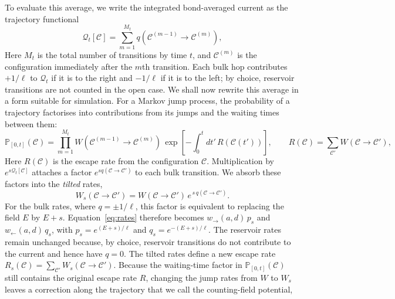 \documentclass[11pt]{article}
\begin{document}
To evaluate this average, we write the integrated bond-averaged current as the trajectory functional
\begin{equation}
    \mathcal{Q}_t[\mathcal{C}] = \sum_{m=1}^{M_t}
        q\!\left(\mathcal{C}^{(m-1)} \to \mathcal{C}^{(m)}\right),
    \label{eq:counting}
\end{equation}
Here $M_t$ is the total number of transitions by time $t$, and
$\mathcal{C}^{(m)}$ is the configuration immediately after the $m$th transition. Each bulk hop contributes $+1/\ell$ to $\mathcal{Q}_t$ if it is to the right and $-1/\ell$ if it is to the left; by choice, reservoir transitions are not counted in the open case.
We shall now rewrite this average in a form suitable for simulation. For a Markov jump process, the probability of a trajectory factorises into contributions from its jumps and the waiting times between them:
\begin{equation}
    \mathbb{P}_{\left[0,t\right]}\left(\mathcal{C}\right) = \prod_{m=1}^{M_t}
        W\!\left(\mathcal{C}^{(m-1)} \to \mathcal{C}^{(m)}\right)\,
    \exp\left[-\int_0^t dt'\, R\!\left(\mathcal{C}(t')\right)\right],
    \qquad
    R(\mathcal{C}) = \sum_{\mathcal{C}'} W\!\left(\mathcal{C} \to \mathcal{C}'\right),
\end{equation}
Here $R(\mathcal{C})$ is the escape rate from the configuration $\mathcal{C}$. Multiplication by $e^{s\mathcal{Q}_t[\mathcal{C}]}$ attaches a factor $e^{s q(\mathcal{C} \to \mathcal{C}')}$ to each bulk transition. We absorb these factors into the \emph{tilted} rates,
\begin{equation}
    W_s\!\left(\mathcal{C} \to \mathcal{C}'\right) =
    W\!\left(\mathcal{C} \to \mathcal{C}'\right)\,
    e^{\,s\,q(\mathcal{C} \to \mathcal{C}')}.
    \label{eq:tilted-rates}
\end{equation}
For the bulk rates, where $q=\pm1/\ell$, this factor is equivalent to replacing the field $E$ by $E+s$. Equation~\ref{eq:rates} therefore becomes $w_\rightarrow(a,d)\,p_s$ and $w_\leftarrow(a,d)\,q_s$, with $p_s=e^{(E+s)/\ell}$ and $q_s=e^{-(E+s)/\ell}$. The reservoir rates remain unchanged because, by choice, reservoir transitions do not contribute to the current and hence have $q=0$.
The tilted rates define a new escape rate $R_s(\mathcal{C}) = \sum_{\mathcal{C}'} W_s(\mathcal{C} \to \mathcal{C}')$. Because the waiting-time factor in $\mathbb{P}_{\left[0,t\right]}\left(\mathcal{C}\right)$ still contains the original escape rate $R$, changing the jump rates from $W$ to $W_s$ leaves a correction along the trajectory that we call the counting-field potential,
\end{document}
